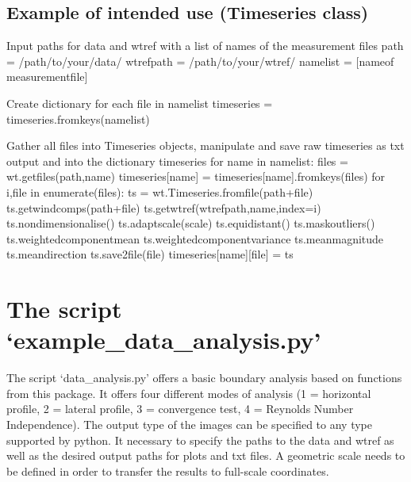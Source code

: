 \documentclass[letterpaper,10pt,english]{sphinxmanual}
\begin{document}
\subsection{Example of intended use (Timeseries class)}
\label{\detokenize{readme_link:example-of-intended-use-timeseries-class}}
%
\begin{sphinxVerbatim}[commandchars=\\\{\}]
\PYGZsh{} Input paths for data and wtref with a list of names of the measurement files
path = \PYGZsq{}/path/to/your/data/\PYGZsq{}
wtref\PYGZus{}path = \PYGZsq{}/path/to/your/wtref/\PYGZsq{}
namelist = [\PYGZsq{}name\PYGZus{}of measurement\PYGZus{}file\PYGZsq{}]

\PYGZsh{} Create dictionary for each file in namelist
time\PYGZus{}series = \PYGZob{}\PYGZcb{}
time\PYGZus{}series.fromkeys(namelist)

\PYGZsh{} Gather all files into Timeseries objects, manipulate and save raw timeseries
\PYGZsh{} as txt output and into the dictionary \PYGZsq{}time\PYGZus{}series\PYGZsq{}
for name in namelist:
    files = wt.get\PYGZus{}files(path,name)
    time\PYGZus{}series[name] = \PYGZob{}\PYGZcb{}
    time\PYGZus{}series[name].fromkeys(files)
    for i,file in enumerate(files):
        ts = wt.Timeseries.from\PYGZus{}file(path+file)
        ts.get\PYGZus{}wind\PYGZus{}comps(path+file)
        ts.get\PYGZus{}wtref(wtref\PYGZus{}path,name,index=i)
        ts.nondimensionalise()
        ts.adapt\PYGZus{}scale(scale)
        ts.equidistant()
        ts.mask\PYGZus{}outliers()
        ts.weighted\PYGZus{}component\PYGZus{}mean
        ts.weighted\PYGZus{}component\PYGZus{}variance
        ts.mean\PYGZus{}magnitude
        ts.mean\PYGZus{}direction
        ts.save2file(file)
        time\PYGZus{}series[name][file] = ts
\end{sphinxVerbatim}


\section{The script ‘example\_data\_analysis.py’}
\label{\detokenize{readme_link:the-script-example-data-analysis-py}}
The script ‘data\_analysis.py’ offers a basic boundary analysis based on functions from this package. It offers four different modes of analysis (1 = horizontal profile, 2 = lateral profile, 3 = convergence test, 4 = Reynolds Number Independence). The output type of the images can be specified to any type supported by python. It necessary to specify the paths to the data and wtref as well as the desired output paths for plots and txt files. A geometric scale needs to be defined in order to transfer
the results to full-scale coordinates.
\end{document}
